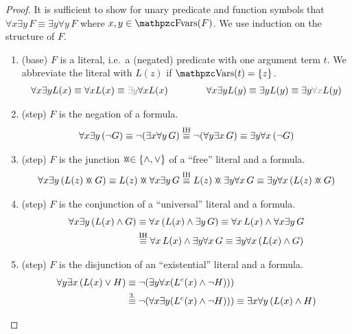 \begin{proof} It is sufficient to show for unary predicate and function symbols 
	that $\forall x\exists y\,F\equiv\exists y\forall y\,F$
	where $x,y\in\fvar(F)$. 
	We use induction on the structure of $F$.
	\begin{enumerate}
		\item (base) $F$ is a literal,
		i.e.~a (negated) predicate with one argument term $t$.
		We abbreviate the literal with $L(z)$ if $\var(t) = \{ z \}$. 
		\begin{gather*}
			\forall x \exists y L(x)  \equiv \forall x L(x) \equiv {\colG \exists y} \forall x L(x)
			\qquad\qquad
			\forall x \exists y L(y)  \equiv \exists y L(y) \equiv \exists y{\colG \forall x}  L(y)
		\end{gather*}
		\item (step) $F$ is the negation of a formula.
		\begin{gather*}
		\forall x \exists y\, (\lnot G) 
		\equiv \lnot (\exists x \forall y\, G)
		\defEV[IH] \lnot (\forall y\exists x \, G) 
		\equiv \exists y \forall x\, (\lnot G)
		\end{gather*}
		\item (step) $F$ is the junction $\landlor\in\{\land,\lor\}$ of a “free” literal and a formula.
		\begin{gather*}
		\forall x\exists y\,( L(z) \landlor G) 
		\equiv L(z) \landlor \forall x\exists y\, G
		\defEV[IH]L(z) \landlor \exists y\forall x\, G
		\equiv\exists y\forall x\,( L(z) \landlor G )
		\end{gather*}
		\item (step) $F$ is the conjunction of a “universal” literal and a formula.
		\begin{align*}
		\forall x \exists y\,({L(x)\land G}) 
		&\equiv \forall x\,({L(x)} \land \exists y\,G)
		\equiv \forall x\,L(x)\land \forall x\exists y\,G
		\\&\defEV[IH] \forall x\,{L(x)} \land \exists y\forall x\,G
		\equiv\exists y \forall x\,({L(x)\land G})
		\end{align*}
		\item (step) $F$ is the disjunction of an “existential” literal and a formula.
		\begin{align*}
		\forall y \exists x\,({L(x)\lor H}) 
		&\equiv\lnot(\exists y \forall x (L^c(x)\land\lnot H)))\\
		&\defEV[3.]\lnot(\forall x\exists y  (L^c(x)\land\lnot H))) 
		\equiv \exists x\forall y\, (L(x) \land H)

\end{align*}
\end{enumerate}
\end{proof}
